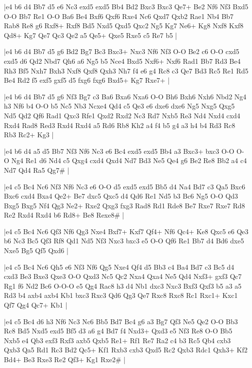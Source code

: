 \whitename{}
\blackname{}
\makegametitle
|e4 b6 d4 Bb7 d5 e6 Nc3 exd5 exd5 Bb4 Bd2 Bxc3 Bxc3 Qe7+ Be2 Nf6 Nf3 Bxd5 O-O Bb7 Re1 O-O Ba6 Be4 Bxf6 Qxf6 Rxe4 Nc6 Qxd7 Qxb2 Rae1 Nb4 Bb7 Rab8 Re8 g6 Rxf8+ Rxf8 Bd5 Nxd5 Qxd5 Qxc2 Ng5 Kg7 Ne6+ Kg8 Nxf8 Kxf8 Qd8+ Kg7 Qe7 Qc3 Qe2 a5 Qe5+ Qxe5 Rxe5 c5 Re7 b5  |

\whitename{}
\blackname{}
\makegametitle
|e4 b6 d4 Bb7 d5 g6 Bd2 Bg7 Bc3 Bxc3+ Nxc3 Nf6 Nf3 O-O Be2 c6 O-O cxd5 exd5 d6 Qd2 Nbd7 Qh6 a6 Ng5 b5 Nce4 Bxd5 Nxf6+ Nxf6 Rad1 Bb7 Rd3 Be4 Rh3 Bf5 Nxh7 Bxh3 Nxf8 Qxf8 Qxh3 Nh7 f4 e6 g4 Rc8 c3 Qe7 Bd3 Rc5 Re1 Rd5 Be4 Rd2 f5 exf5 gxf5 d5 fxg6 fxg6 Bxd5+ Kg7 Rxe7+  |

\whitename{}
\blackname{}
\makegametitle
|e4 b6 d4 Bb7 d5 g6 Nf3 Bg7 c3 Ba6 Bxa6 Nxa6 O-O Bh6 Bxh6 Nxh6 Nbd2 Ng4 h3 Nf6 b4 O-O b5 Nc5 Nb3 Ncxe4 Qd4 c5 Qe3 e6 dxe6 dxe6 Ng5 Nxg5 Qxg5 Nd5 Qd2 Qf6 Rad1 Qxc3 Rfe1 Qxd2 Rxd2 Nc3 Rd7 Nxb5 Re3 Nd4 Nxd4 cxd4 Rxd4 Rad8 Red3 Rxd4 Rxd4 a5 Rd6 Rb8 Kh2 a4 f4 b5 g4 a3 h4 b4 Rd3 Rc8 Rb3 Rc2+ Kg3  |

\whitename{}
\blackname{}
\makegametitle
|e4 b6 d4 a5 d5 Bb7 Nf3 Nf6 Nc3 e6 Bc4 exd5 exd5 Bb4 a3 Bxc3+ bxc3 O-O O-O Ng4 Re1 d6 Nd4 c5 Qxg4 cxd4 Qxd4 Nd7 Bd3 Ne5 Qe4 g6 Be2 Re8 Bb2 a4 c4 Nd7 Qd4 Ra5 Qg7\#  |

\whitename{}
\blackname{}
\makegametitle
|e4 c5 Bc4 Nc6 Nf3 Nf6 Nc3 e6 O-O d5 exd5 exd5 Bb5 d4 Na4 Bd7 c3 Qa5 Bxc6 Bxc6 cxd4 Bxa4 Qe2+ Be7 dxc5 Qxc5 d4 Qd6 Re1 Nd5 b3 Bc6 Ng5 O-O Qd3 Bxg5 Bxg5 Nf4 Qg3 Ne2+ Rxe2 Qxg3 fxg3 Rad8 Rd1 Rde8 Be7 Rxe7 Rxe7 Rd8 Re2 Rxd4 Rxd4 b6 Rd8+ Be8 Rexe8\#  |

\whitename{}
\blackname{}
\makegametitle
|e4 c5 Bc4 Nc6 Qf3 Nf6 Qg3 Nxe4 Bxf7+ Kxf7 Qf4+ Nf6 Qc4+ Ke8 Qxc5 e6 Qe3 b6 Nc3 Bc5 Qf3 Rf8 Qd1 Nd5 Nf3 Nxc3 bxc3 e5 O-O Qf6 Re1 Bb7 d4 Bd6 dxe5 Nxe5 Bg5 Qf5 Qxd6  |

\whitename{}
\blackname{}
\makegametitle
|e4 c5 Bc4 Nc6 Qh5 e6 Nf3 Nf6 Qg5 Nxe4 Qf4 d5 Bb3 c4 Ba4 Bd7 c3 Bc5 d4 cxd3 Be3 Bxe3 Qxe3 O-O Qxd3 Nc5 Qc2 Nxa4 Qxa4 Ne5 Qd4 Nxf3+ gxf3 Qc7 Rg1 f6 Nd2 Bc6 O-O-O e5 Qg4 Rac8 h3 d4 Nb1 dxc3 Nxc3 Bxf3 Qxf3 b5 a3 a5 Rd3 b4 axb4 axb4 Kb1 bxc3 Rxc3 Qd6 Qg3 Qe7 Rxc8 Rxc8 Rc1 Rxc1+ Kxc1 Qf7 Qg4 Qc7+ Kb1  |

\whitename{}
\blackname{}
\makegametitle
|e4 c5 Bc4 d6 h3 Nf6 Nc3 Nc6 Bb5 Bd7 Bc4 g6 a3 Bg7 Qf3 Ne5 Qe2 O-O Bb3 Rc8 Bd5 Nxd5 exd5 Bf5 d3 a6 g4 Bd7 f4 Nxd3+ Qxd3 e5 Nf3 Re8 O-O Bb5 Nxb5 e4 Qb3 exf3 Rxf3 axb5 Qxb5 Re1+ Rf1 Re7 Ra2 c4 b3 Rc5 Qb4 cxb3 Qxb3 Qa5 Rd1 Rc3 Bd2 Qc5+ Kf1 Rxb3 cxb3 Qxd5 Rc2 Qxb3 Rdc1 Qxh3+ Kf2 Bd4+ Be3 Rxe3 Re2 Qf3+ Kg1 Rxe2\#  |

